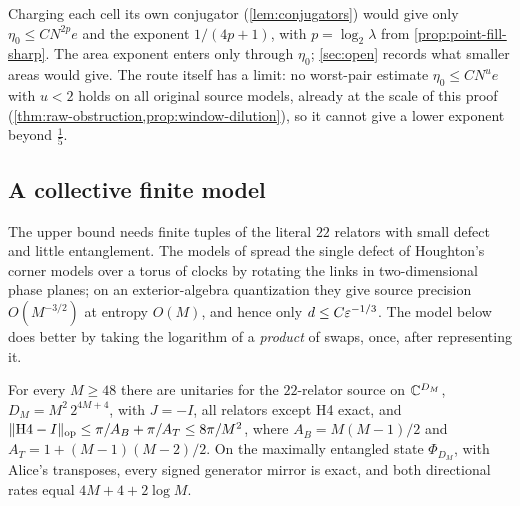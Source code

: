 Charging each cell its own conjugator (\cref{lem:conjugators}) would give only $\eta_0\le CN^{2p}e$ and the exponent
$1/(4p+1)$, with $p=\log_2\lambda$ from \cref{prop:point-fill-sharp}. The area exponent enters only through $\eta_0$;
\cref{sec:open} records what smaller areas would give. The route itself has a limit: no worst-pair estimate $\eta_0\le CN^ue$ with
$u<2$ holds on all original source models, already at the scale of this proof (\cref{thm:raw-obstruction,prop:window-dilution}), so
it cannot give a lower exponent beyond $\frac15$.

\subsection{A collective finite model}\label{sec:point-collective}

The upper bound needs finite tuples of the literal $22$ relators with small defect and little entanglement. The models of
\cite[Proposition~6.5]{DM-H3} spread the single defect of Houghton's corner models over a torus of clocks by rotating the links in
two-dimensional phase planes; on an exterior-algebra quantization they give source precision $O(M^{-3/2})$ at entropy $O(M)$, and
hence only $d\le C\varepsilon^{-1/3}$. The model below does better by taking the logarithm of a \emph{product} of swaps, once, after
representing it.

\begin{proposition}\label{prop:collective}
For every $M\ge48$ there are unitaries for the $22$-relator source on $\mathbb C^{D_M}$, $D_M=M^2\,2^{4M+4}$, with $J=-I$, all relators
except H4 exact, and $\lVert \mathrm{H4}-I\rVert_{\mathrm{op}}\le\pi/A_B+\pi/A_T\le8\pi/M^2$, where $A_B=M(M-1)/2$ and $A_T=1+(M-1)(M-2)/2$. On the maximally
entangled state $\Phi_{D_M}$, with Alice's transposes, every signed generator mirror is exact, and both directional rates equal
$4M+4+2\log M$.
\end{proposition}

